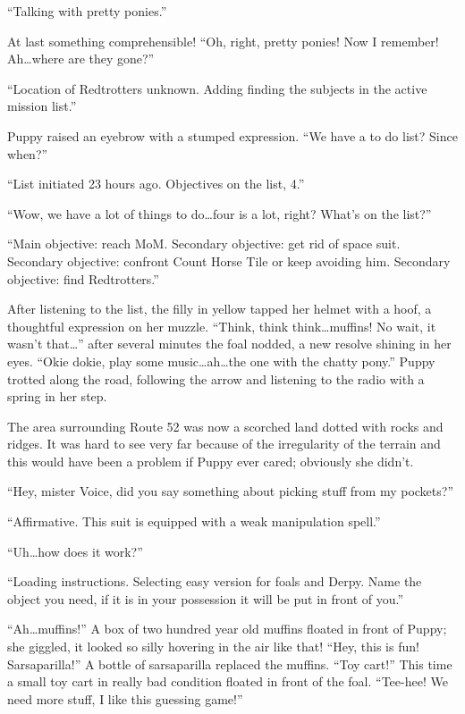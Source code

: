 ``{\mt Talking with pretty ponies.}''

At last something comprehensible! ``Oh, right, pretty ponies! Now I remember! Ah\dots where are they gone?''

``{\mt Location of Redtrotters unknown. Adding finding the subjects in the active mission list.}''

Puppy raised an eyebrow with a stumped expression. ``We have a to do list? Since when?''

``{\mt List initiated 23 hours ago. Objectives on the list, 4.}''

``Wow, we have a lot of things to do\dots four is a lot, right? What's on the list?''

``{\mt Main objective: reach MoM. Secondary objective: get rid of space suit. Secondary objective: confront Count Horse Tile or keep avoiding him. Secondary objective: find Redtrotters.}''

After listening to the list, the filly in yellow tapped her helmet with a hoof, a thoughtful expression on her muzzle. ``Think, think think\dots muffins! No wait, it wasn't that\dots '' after several minutes the foal nodded, a new resolve shining in her eyes. ``Okie dokie, play some music\dots ah\dots the one with the chatty pony.'' Puppy trotted along the road, following the arrow and listening to the radio with a spring in her step.

The area surrounding Route 52 was now a scorched land dotted with rocks and ridges. It was hard to see very far because of the irregularity of the terrain and this would have been a problem if Puppy ever cared; obviously she didn't.

``Hey, mister Voice, did you say something about picking stuff from my pockets?''

``{\mt Affirmative. This suit is equipped with a weak manipulation spell.}''

``Uh\dots how does it work?''

``{\mt Loading instructions. Selecting easy version for foals and Derpy. Name the object you need, if it is in your possession it will be put in front of you.}''

``Ah\dots muffins!'' A box of two hundred year old muffins floated in front of Puppy; she giggled, it looked so silly hovering in the air like that! ``Hey, this is fun! Sarsaparilla!'' A bottle of sarsaparilla replaced the muffins. ``Toy cart!'' This time a small toy cart in really bad condition floated in front of the foal. ``Tee-hee! We need more stuff, I like this guessing game!''

